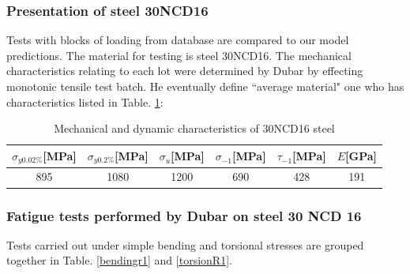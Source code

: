 \documentclass[3p,times,number,review]{elsarticle}
\begin{document}
\subsubsection{Presentation of steel 30NCD16}
Tests with blocks of loading from database are compared to our model predictions. The material for testing is steel 30NCD16. The mechanical characteristics relating to each lot were determined by Dubar \cite{Dubar1992} by effecting monotonic tensile test batch. He eventually define ``average material" one who has characteristics listed in Table. \ref{30ncdchar}:

\begin{table}[!h]
\centering
\begin{tabular}{|c|c|c|c|l|c|}
\hline
\textbf{$\sigma_{y0.02\%}${[}MPa{]}} & \textbf{$\sigma_{y0.2\%}${[}MPa{]}} & \textbf{$\sigma_u${[}MPa{]}} & \textbf{$\sigma_{-1}${[}MPa{]}} & \textbf{$\tau_{-1}${[}MPa{]}} & \textbf{$E${[}GPa{]}}\\ \hline
895                                  & 1080                                & 1200                         & 690                             & \multicolumn{1}{c|}{428}     & 191 \\ \hline
\end{tabular}
\caption{Mechanical and dynamic characteristics of 30NCD16 steel \cite{Dubar1992}}
\label{30ncdchar}
\end{table}

\subsubsection{Fatigue tests performed by Dubar on steel 30 NCD 16}
Tests carried out under simple bending and torsional stresses are grouped together in
Table. \ref{bendingr1} and \ref{torsionR1}.
\end{document}
